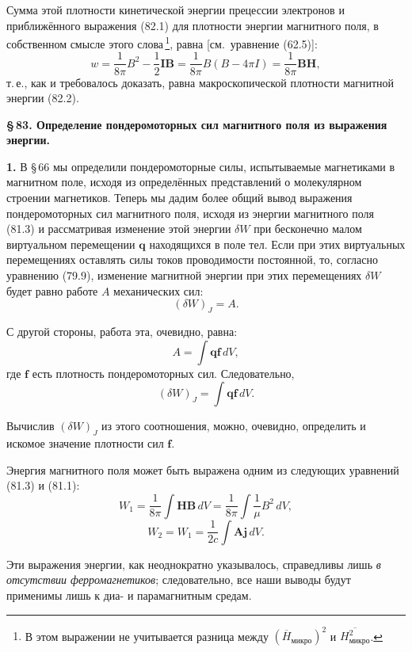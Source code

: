 \documentclass[a4paper,12pt]{article}
\begin{document}
Сумма этой плотности кинетической энергии прецессии электронов и
приближённого выражения (82.1) для плотности энергии магнитного поля,
в собственном смысле этого слова\,\footnote{В этом выражении не
учитывается разница между $(\overline{H}_{\text{микро}})^2$ и
$\overline{H^2_{\text{микро}}}$.}, равна [см.\ уравнение (62.5)]:
$$
    w = \frac{1}{8\pi}B^2 - \frac{1}{2}\mathbf{I}\mathbf{B}
      = \frac{1}{8\pi}B(B - 4\pi I) = \frac{1}{8\pi}\mathbf{B}\mathbf{H},
$$
т.\,е., как и требовалось доказать, равна макроскопической плотности
магнитной энергии (82.2).

\bigskip
\noindent\textbf{\S\,83. Определение пондеромоторных сил магнитного поля
из выражения энергии.}

\medskip
\textbf{1.} В §\,66 мы определили пондеромоторные силы, испытываемые
магнетиками в магнитном поле, исходя из определённых представлений
о молекулярном строении магнетиков. Теперь мы дадим более общий вывод
выражения пондеромоторных сил магнитного поля, исходя из энергии
магнитного поля (81.3) и рассматривая изменение этой энергии $\delta W$
при бесконечно малом виртуальном перемещении $\mathbf{q}$ находящихся
в поле тел. Если при этих виртуальных перемещениях оставлять силы токов
проводимости постоянной, то, согласно уравнению (79.9), изменение
магнитной энергии при этих перемещениях $\delta W$ будет равно работе
$A$ механических сил:
$$
    (\delta W)_J = A.
$$


С другой стороны, работа эта, очевидно, равна:
$$
    A = \int \mathbf{q}\mathbf{f}\,dV,
$$
где $\mathbf{f}$ есть плотность пондеромоторных сил. Следовательно,
\begin{equation}
    (\delta W)_J = \int \mathbf{q}\mathbf{f}\,dV.
    \tag{83.1}
\end{equation}

Вычислив $(\delta W)_J$ из этого соотношения, можно, очевидно,
определить и искомое значение плотности сил $\mathbf{f}$.

Энергия магнитного поля может быть выражена одним из следующих
уравнений (81.3) и (81.1):
$$
    W_1 = \frac{1}{8\pi}\int \mathbf{H}\mathbf{B}\,dV
        = \frac{1}{8\pi}\int \frac{1}{\mu}B^2\,dV,
$$
$$
    W_2 = W_1 = \frac{1}{2c}\int \mathbf{A}\mathbf{j}\,dV.
$$

Эти выражения энергии, как неоднократно указывалось, справедливы лишь
\textit{в отсутствии ферромагнетиков}; следовательно, все наши выводы
будут применимы лишь к диа- и парамагнитным средам.
\end{document}

